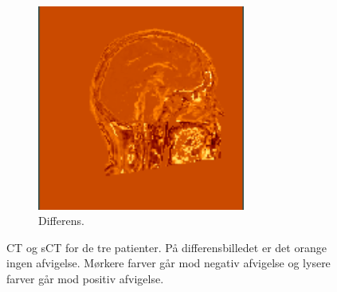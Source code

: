 \begin{figure}[H]
\begin{subfigure}{0.3\textwidth}
        \includegraphics[width=0.75\textwidth]{colager/over_tid_sct/over_tid_sct_210445_sub.png}
        \caption{Differens.}
        \label{col:over_time_sct_pat3_sub}
    \end{subfigure}
    \caption{CT og sCT for de tre patienter. På differensbilledet er det orange ingen afvigelse. Mørkere farver går mod negativ afvigelse og lysere farver går mod positiv afvigelse.}
    \label{col:over_time_sct}
\end{figure}

